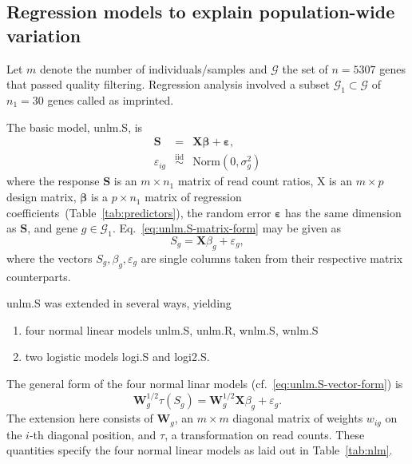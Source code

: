 \documentclass[letterpaper]{article}
\begin{document}
\subsection{Regression models to explain population-wide variation}
\label{sec:methods-regression}

Let \(m\) denote the number of individuals/samples and \(\mathcal{G}\) the set
of \(n=5307\) genes that passed quality filtering.  Regression analysis
involved a subset \(\mathcal{G}_1\subset\mathcal{G}\) of \(n_1=30\) genes
called as imprinted.

The basic model, unlm.S, is
\begin{eqnarray}
\mathbf{S} &=& \mathbf{X} \boldsymbol{\beta} + \boldsymbol{\varepsilon},
\label{eq:unlm.S-matrix-form} \\
\varepsilon_{ig} &\overset{\mathrm{iid}}{\sim}& \mathrm{Norm}(0, \sigma^2_g)
\end{eqnarray}
where the response \(\mathbf{S}\) is an \(m\times n_1\) matrix of read count ratios,
\(\mathrm{X}\) is an \(m\times p\) design matrix, \(\boldsymbol{\beta}\) is a \(p\times n_1\) matrix of regression
coefficients~(Table~\ref{tab:predictors}), the random error \(\boldsymbol{\varepsilon}\) has the same
dimension as \(\mathbf{S}\), and gene \(g\in \mathcal{G}_1\).  Eq.~\ref{eq:unlm.S-matrix-form} may be given as
\begin{equation}
S_g = \mathbf{X} \beta_g + \varepsilon_g,
\label{eq:unlm.S-vector-form}
\end{equation}
where the vectors \(S_g, \beta_g, \varepsilon_g\)
are single columns taken from their respective matrix counterparts.

unlm.S was extended in several ways, yielding
\begin{enumerate}
\item four normal linear models unlm.S, unlm.R, wnlm.S, wnlm.S
\item two logistic models logi.S and logi2.S.
\end{enumerate}

The general form of the four normal linar models
(cf.~\ref{eq:unlm.S-vector-form}) is
\begin{equation}
\mathbf{W}_g^{1/2} \tau(S_g) = \mathbf{W}_g^{1/2} \mathbf{X} \beta_g + \varepsilon_g.
\label{eq:nlm-general}
\end{equation}
The extension here consists of \(\mathbf{W}_g\), an \(m\times m\) diagonal matrix of
weights \(w_{ig}\) on the \(i\)-th diagonal position, and \(\tau\), a
transformation on read counts.  These quantities specify the four normal
linear models as laid out in Table~\ref{tab:nlm}.
\end{document}
